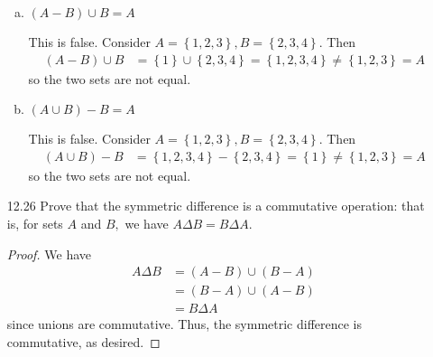 \documentclass{article}
\begin{document}
\begin{itemize}
\begin{enumerate}[a.]
			\item $(A-B)\cup B=A$
				\begin{soln}
					This is false. Consider $A=\left\{ 1, 2, 3 \right\}, B=\left\{ 2, 3, 4 \right\}.$ Then
					\begin{align*}
						(A-B) \cup B &= \left\{ 1 \right\}\cup \left\{ 2, 3, 4 \right\} = \left\{ 1, 2, 3, 4 \right\} \neq \left\{ 1, 2, 3 \right\} = A
					\end{align*}
					so the two sets are not equal.
				\end{soln}

			\item $(A\cup B)-B=A$
				\begin{soln}
					This is false. Consider $A=\left\{ 1, 2, 3 \right\}, B=\left\{ 2, 3, 4 \right\}.$ Then
					\begin{align*}
						(A\cup B)-B &= \left\{ 1, 2, 3, 4 \right\} - \left\{ 2, 3, 4 \right\} = \left\{ 1 \right\} \neq \left\{ 1, 2, 3 \right\} = A
					\end{align*}
					so the two sets are not equal.
				\end{soln}
				
		\end{enumerate}

	\item[12.26] Prove that the symmetric difference is a commutative operation: that is, for sets $A$ and $B,$ we have $A\Delta B=B\Delta A.$
		\begin{proof}
			We have 
			\begin{align*}
				A\Delta B &= (A-B)\cup (B-A) \\
				&= (B-A)\cup (A-B) \\
				&= B\Delta A
			\end{align*}
			since unions are commutative. Thus, the symmetric difference is commutative, as desired.
		\end{proof}
		
\end{itemize}
\end{document}
